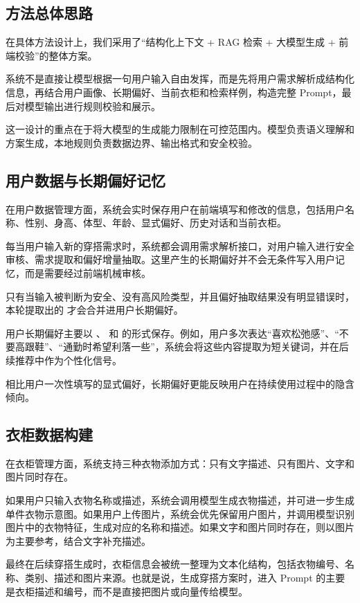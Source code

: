 \documentclass{applemlr}
\begin{document}
\subsection{方法总体思路}

在具体方法设计上，我们采用了``结构化上下文 + RAG 检索 + 大模型生成 + 前端校验''的整体方案。

系统不是直接让模型根据一句用户输入自由发挥，而是先将用户需求解析成结构化信息，再结合用户画像、长期偏好、当前衣柜和检索样例，构造完整 Prompt，最后对模型输出进行规则校验和展示。

这一设计的重点在于将大模型的生成能力限制在可控范围内。模型负责语义理解和方案生成，本地规则负责数据边界、输出格式和安全校验。

\subsection{用户数据与长期偏好记忆}

在用户数据管理方面，系统会实时保存用户在前端填写和修改的信息，包括用户名称、性别、身高、体型、年龄、显式偏好、历史对话和当前衣柜。

每当用户输入新的穿搭需求时，系统都会调用需求解析接口，对用户输入进行安全审核、需求提取和偏好增量抽取。这里产生的长期偏好并不会无条件写入用户记忆，而是需要经过前端机械审核。

只有当输入被判断为安全、没有高风险类型，并且偏好抽取结果没有明显错误时，本轮提取出的  才会合并进用户长期偏好。

用户长期偏好主要以 、 和  的形式保存。例如，用户多次表达``喜欢松弛感''、``不要高跟鞋''、``通勤时希望利落一些''，系统会将这些内容提取为短关键词，并在后续推荐中作为个性化信号。

相比用户一次性填写的显式偏好，长期偏好更能反映用户在持续使用过程中的隐含倾向。

\subsection{衣柜数据构建}

在衣柜管理方面，系统支持三种衣物添加方式：只有文字描述、只有图片、文字和图片同时存在。

如果用户只输入衣物名称或描述，系统会调用模型生成衣物描述，并可进一步生成单件衣物示意图。如果用户上传图片，系统会优先保留用户图片，并调用模型识别图片中的衣物特征，生成对应的名称和描述。如果文字和图片同时存在，则以图片为主要参考，结合文字补充描述。

最终在后续穿搭生成时，衣柜信息会被统一整理为文本化结构，包括衣物编号、名称、类别、描述和图片来源。也就是说，生成穿搭方案时，进入 Prompt 的主要是衣柜描述和编号，而不是直接把图片或向量传给模型。
\end{document}
